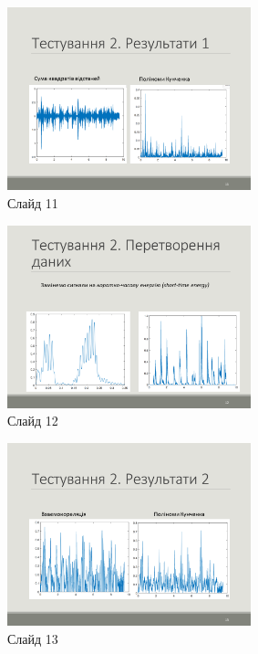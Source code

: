\documentclass{thesis_utf8}
\begin{document}
\begin{figure}[h]
    \centering
    \includegraphics[width=0.63\textwidth]{slides/slide11.png}
    \caption{Слайд 11}
\end{figure}

\begin{figure}[h]
    \centering
    \includegraphics[width=0.63\textwidth]{slides/slide12.png}
    \caption{Слайд 12}
\end{figure}

\begin{figure}[h]
    \centering
    \includegraphics[width=0.63\textwidth]{slides/slide13.png}
    \caption{Слайд 13}
\end{figure}
\end{document}

